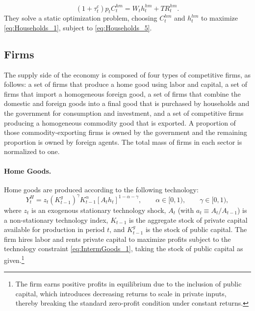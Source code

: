 \documentclass[12pt]{article}
\begin{document}
\begin{equation}
\label{eq:Households_5}
(1+\tau^c_t)p_tC^{hm}_{t}=W_{t}h^{hm}_{t}+ TR^{hm}_t.
\end{equation}%
They solve a static optimization problem, choosing $C_t^{hm}$ and $h_t^{hm}$ to maximize \eqref{eq:Households_1}, subject to \eqref{eq:Households_5}.

\subsection{Firms}

The supply side of the economy is composed of four types of competitive firms, as follows: a set of firms that produce a home good using labor and capital, a set of firms that import a homogeneous foreign good, a set of firms that combine the domestic and foreign goods into a final good that is purchased by households and the government for consumption and investment, and a set of competitive firms producing a homogeneous commodity good that is exported. A proportion of those commodity-exporting firms is owned by the government and the remaining proportion is owned by foreign agents. The total mass of firms in each sector is normalized to one.

\paragraph{Home Goods.}

Home goods are produced according to the following technology:%
\begin{equation}
Y_{t}^{H}=z_{t}\left(K^g_{t-1}\right)^{\gamma}K_{t-1}^{\alpha }[A_{t}h_{t}]^{1-\alpha - \gamma },\qquad
\alpha \in \lbrack 0,1), \qquad \gamma \in \lbrack 0,1), \label{eq:IntermGoods_1}
\end{equation}%
where $z_{t}$ is an exogenous stationary technology shock, $A_{t}$ (with $a_{t}\equiv A_{t}/A_{t-1}$) is a non-stationary technology index, $K_{t-1}$ is the aggregate stock of private capital available for production in period $t$, and $K^g_{t-1}$ is the stock of public capital.
The firm hires labor and rents private capital to maximize profits subject to the technology constraint \eqref{eq:IntermGoods_1}, taking the stock of public capital as given.\footnote{The firm earns positive profits in equilibrium due to the inclusion of public capital, which introduces decreasing returns to scale in private inputs, thereby breaking the standard zero-profit condition under constant returns.}
\end{document}
